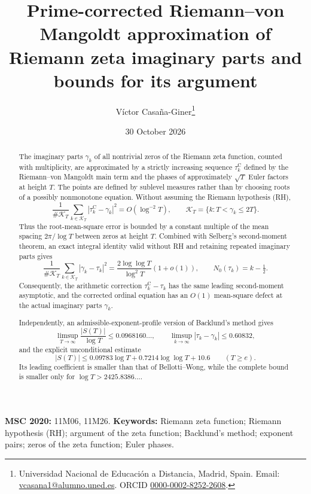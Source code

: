 \documentclass[11pt,a4paper]{article}
\title{Prime-corrected Riemann--von Mangoldt approximation of Riemann zeta imaginary parts and bounds for its argument}
\author{V\'ictor Casa\~na-Giner\thanks{Universidad Nacional de Educaci\'on a Distancia, Madrid, Spain. Email: \href{mailto:vcasana1@alumno.uned.es}{vcasana1@alumno.uned.es}. ORCID \href{https://orcid.org/0000-0002-8252-2608}{0000-0002-8252-2608}.}}
\date{30 October 2026}
\numberwithin{equation}{section}
\theoremstyle{definition}
\theoremstyle{remark}
\begin{document}
\maketitle

\begin{abstract}
The imaginary parts $\gamma_k$ of all nontrivial zeros of the Riemann zeta function, counted with multiplicity, are approximated by a strictly increasing sequence $\tau_k^{\mathrm C}$ defined by the Riemann--von Mangoldt main term and the phases of approximately $\sqrt T$ Euler factors at height $T$. The points are defined by sublevel measures rather than by choosing roots of a possibly nonmonotone equation. Without assuming the Riemann hypothesis (RH),
\[
\frac{1}{\#\mathcal K_T}\sum_{k\in\mathcal K_T}
|\tau_k^{\mathrm C}-\gamma_k|^2=O(\log^{-2}T),
\qquad \mathcal K_T=\{k:T<\gamma_k\le2T\}.
\]
Thus the root-mean-square error is bounded by a constant multiple of the mean spacing $2\pi/\log T$ between zeros at height $T$. Combined with Selberg's second-moment theorem, an exact integral identity valid without RH and retaining repeated imaginary parts gives
\[
\frac1{\#\mathcal K_T}\sum_{k\in\mathcal K_T}
|\gamma_k-\tau_k|^2
=\frac{2\log\log T}{\log^2T}(1+o(1)),
\qquad N_0(\tau_k)=k-\tfrac12.
\]
Consequently, the arithmetic correction $\tau_k^{\mathrm C}-\tau_k$ has the same leading second-moment asymptotic, and the corrected ordinal equation has an $O(1)$ mean-square defect at the actual imaginary parts $\gamma_k$.

Independently, an admissible-exponent-profile version of Backlund's method gives
\[
\limsup_{T\to\infty}\frac{|S(T)|}{\log T}\le0.0968160\ldots,
\qquad
\limsup_{k\to\infty}|\tau_k-\gamma_k|\le0.60832,
\]
and the explicit unconditional estimate
\[
|S(T)|\le0.09783\log T+0.7214\log\log T+10.6
\qquad (T\ge e).
\]
Its leading coefficient is smaller than that of Bellotti--Wong, while the complete bound is smaller only for $\log T>2425.8386\ldots$.
\end{abstract}

\medskip
\noindent\textbf{MSC 2020:} 11M06, 11M26. \quad \textbf{Keywords:} Riemann zeta function; Riemann hypothesis (RH); argument of the zeta function; Backlund's method; exponent pairs; zeros of the zeta function; Euler phases.

\tableofcontents

\end{document}
